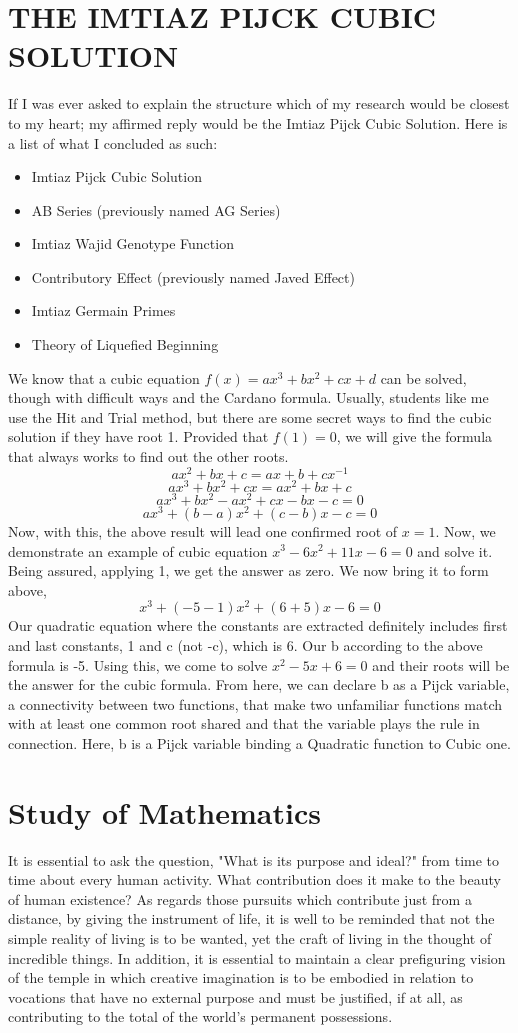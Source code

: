\documentclass[a4paper,12pt]{book}[2004/02/16]
\providecommand{\hypertarget}[2]{#2}
\theoremstyle{ilemma}
\theoremstyle{itheorem}
\theoremstyle{iother}
\theoremstyle{icorollary}
\theoremstyle{numcorollary}
\theoremstyle{idefinition}
\begin{document}
\chapter*{THE IMTIAZ PIJCK CUBIC SOLUTION}
If I was ever asked to explain the structure which of my research would be closest to my heart; my affirmed reply would be the Imtiaz Pijck Cubic Solution. Here is a list of what I concluded as such:
\begin{itemize}
    \item Imtiaz Pijck Cubic Solution
    \item AB Series (previously named AG Series)
    \item Imtiaz Wajid Genotype Function
    \item Contributory Effect (previously named Javed Effect)
    \item Imtiaz Germain Primes
    \item Theory of Liquefied Beginning 
\end{itemize}
We know that a cubic equation $f(x)=ax^3+bx^2+cx+d$ can be solved, though with difficult ways and the Cardano formula. Usually, students like me use the Hit and Trial method, but there are some secret ways to find the cubic solution if they have root 1. Provided that $f(1)=0$, we will give the formula that always works to find out the other roots.
$$
ax^2+bx+c=ax+b+cx^{-1}
$$
$$
ax^3+bx^2+cx=ax^2+bx+c
$$
$$
ax^3+bx^2-ax^2+cx-bx-c=0
$$
$$
ax^3+(b-a)x^2+(c-b)x-c=0
$$
Now, with this, the above result will lead one confirmed root of $x=1$. Now, we demonstrate an example of cubic equation $x^3-6x^2+11x-6=0$ and solve it. Being assured, applying 1, we get the answer as zero. We now bring it to form above,
$$
x^3+(-5-1)x^2+(6+5)x-6=0
$$
Our quadratic equation where the constants are extracted definitely includes first and last constants, 1 and c (not -c), which is 6. Our b according to the above formula is -5. Using this, we come to solve $x^2-5x+6=0$ and their roots will be the answer for the cubic formula. From here, we can declare b as a Pijck variable, a connectivity between two functions, that make two unfamiliar functions match with at least one common root shared and that the variable plays the rule in connection. Here, b is a Pijck variable binding a Quadratic function to Cubic one.
\tableofcontents
\mainmatter
\chapter{Study of Mathematics}\hypertarget{chapI}{}%
It is essential to ask the question, "What is its purpose and ideal?" from time to time about every human activity. What contribution does it make to the beauty of human existence? As regards those pursuits which contribute just from a distance,
by giving the instrument of life, it is well to be reminded that not
the simple reality of living is to be wanted, yet the craft of living in the
thought of incredible things. In addition, it is essential to maintain a clear prefiguring vision of the temple in which creative imagination is to be embodied in relation to vocations that have no external purpose and must be justified, if at all, as contributing to the total of the world's permanent possessions.
\end{document}
